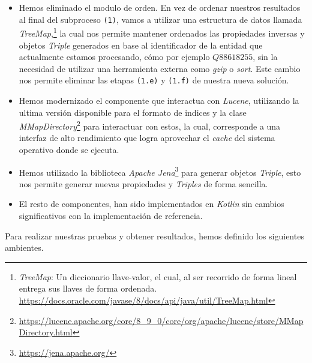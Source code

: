 \begin{itemize}
    \item Hemos eliminado el modulo de orden. En vez de ordenar nuestros resultados al final del subproceso \texttt{(1)}, vamos a utilizar una estructura de datos llamada \textit{TreeMap},\footnote{\textit{TreeMap}: Un diccionario llave-valor, el cual, al ser recorrido de forma lineal entrega sus llaves de forma ordenada. \href{https://docs.oracle.com/javase/8/docs/api/java/util/TreeMap.html}{https://docs.oracle.com/javase/8/docs/api/java/util/TreeMap.html}} la cual nos permite mantener ordenados las propiedades inversas y objetos \textit{Triple} generados en base al identificador de la entidad que actualmente estamos procesando, cómo por ejemplo $Q88618255$, sin la necesidad de utilizar una herramienta externa como \textit{gzip} o \textit{sort}. Este cambio nos permite eliminar las etapas \texttt{(1.e)} y \texttt{(1.f)} de nuestra nueva solución.
    \item Hemos modernizado el componente que interactua con \textit{Lucene}, utilizando la ultima versión disponible para el formato de indices y la clase \textit{MMapDirectory}\footnote{\href{https://lucene.apache.org/core/8\_9\_0/core/org/apache/lucene/store/MMapDirectory.html}{https://lucene.apache.org/core/8\_9\_0/core/org/apache/lucene/store/MMapDirectory.html}} para interactuar con estos, la cual, corresponde a una interfaz de alto rendimiento que logra aprovechar el \textit{cache} del sistema operativo donde se ejecuta.
    \item Hemos utilizado la biblioteca \textit{Apache Jena}\footnote{\href{https://jena.apache.org/}{https://jena.apache.org/}} para generar objetos \textit{Triple}, esto nos permite generar nuevas propiedades y \textit{Triples} de forma sencilla.
    \item El resto de componentes, han sido implementados en \textit{Kotlin} sin cambios significativos con la implementación de referencia.
\end{itemize}

Para realizar nuestras pruebas y obtener resultados, hemos definido los siguientes ambientes.

